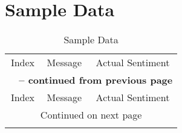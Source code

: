 \section{Sample Data} %
\label{app:sample_data}
	\begin{center}
		\begin{footnotesize}
		\begin{longtable}{cp{3.8in}c}
			\label{tab:sample_data}\\
			\caption{\normalsize Sample Data}\\
			\toprule
			\multicolumn{1}{c}{Index} &
			\multicolumn{1}{c}{Message} &
			\multicolumn{1}{c}{Actual Sentiment}\\
			\toprule
			\endfirsthead

			\multicolumn{3}{c}{{\bfseries \tablename\ \thetable{} -- continued from previous page}}\\
			\toprule
			\multicolumn{1}{c}{Index} &
			\multicolumn{1}{c}{Message} &
			\multicolumn{1}{c}{Actual Sentiment}\\
			\toprule
			\endhead

			\bottomrule
			\multicolumn{3}{c}{{Continued on next page}} \\
			\bottomrule
			\endfoot

			\bottomrule\bottomrule
			\endlastfoot


\end{longtable}
\end{footnotesize}
\end{center}
